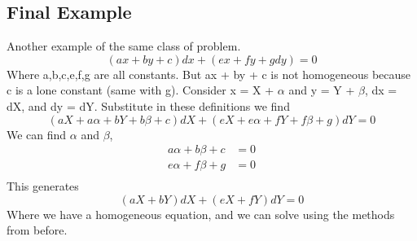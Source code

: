 \documentclass{article}
\newcommand{\be}{\begin{equation}}
\newcommand{\ee}{\end{equation}}
\begin{document}
\subsection*{Final Example}
Another example of the same class of problem.
\be
(ax + by + c) dx + (ex + fy + g dy) = 0
\ee
Where a,b,c,e,f,g are all constants.
But ax + by + c is not homogeneous because c is a lone constant (same with g).
Consider x = X + $\alpha$ and y = Y + $\beta$, dx = dX, and dy = dY.
Substitute in these definitions we find
\be
(aX + a\alpha + bY + b\beta + c) dX + (eX + e\alpha + fY + f\beta + g) dY = 0
\ee
We can find $\alpha$ and $\beta$,
\be
\begin{split}
    a\alpha + b\beta + c &= 0 \\
    e\alpha + f\beta + g &= 0 \\
\end{split}
\ee
This generates
\be
(aX + bY)dX + (eX + fY)dY = 0
\ee
Where we have a homogeneous equation, and we can solve using the methods from before.
\end{document}
